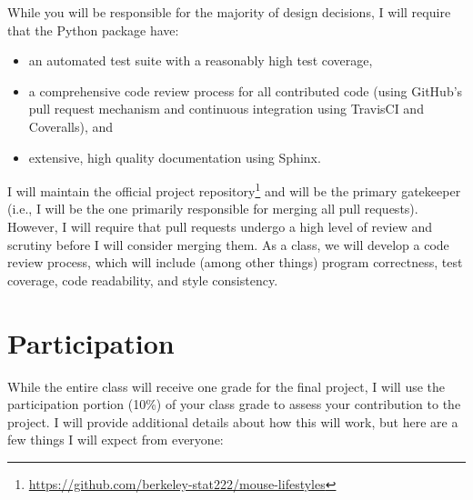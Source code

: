 \documentclass[11pt, oneside]{article}   	%
\begin{document}
While you will be responsible for the majority of design decisions, I will
require that the Python package have:

\begin{itemize}
\item an automated test suite with a reasonably high test coverage,
\item a comprehensive code review process for all contributed code (using
   GitHub's pull request mechanism and continuous integration using
   TravisCI and Coveralls), and
\item extensive, high quality documentation using Sphinx.
\end{itemize}

I will maintain the official project
repository\footnote{\url{https://github.com/berkeley-stat222/mouse-lifestyles}}
and will be the primary gatekeeper (i.e., I will be the one primarily
responsible for merging all pull requests).  However, I will require that pull
requests undergo a high level of review and scrutiny before I will consider
merging them.  As a class, we will develop a code review process, which will
include (among other things) program correctness, test coverage, code
readability, and style consistency.

%
%
%

\section{Participation}

While the entire class will receive one grade for the final project, I will use
the participation portion (10\%) of your class grade to assess your
contribution to the project.  I will provide additional details about how this
will work, but here are a few things I will expect from everyone:
\end{document}
